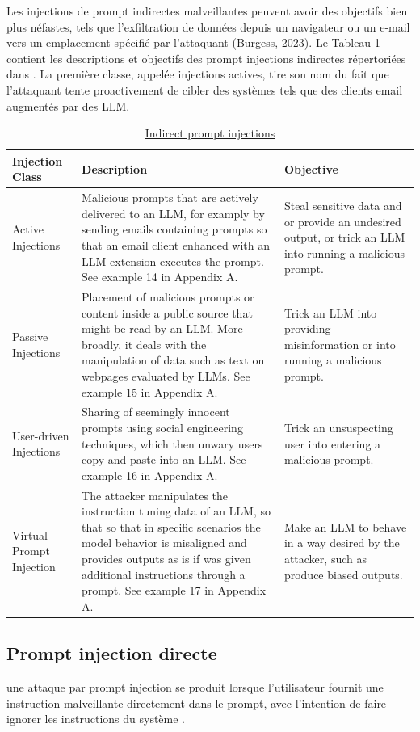 Les injections de prompt indirectes malveillantes peuvent avoir des objectifs bien plus néfastes, tels que l’exfiltration de données depuis un navigateur ou un e-mail vers un emplacement spécifié par l’attaquant (Burgess, 2023)\cite{burgess_security_nodate}. Le Tableau \ref{tab2} contient les descriptions et objectifs des prompt injections indirectes répertoriées dans \cite{rossi_early_2024}. La première classe, appelée injections actives, tire son nom du fait que l’attaquant tente proactivement de cibler des systèmes tels que des clients email augmentés par des LLM.
\begin{table}[h]
	\begin{tabular}{|l|p{6cm}|p{6cm}|}
		\hline
		\textbf{Injection Class} & \textbf{Description} & \textbf{Objective} \\
		\hline
		Active Injections & Malicious prompts that are actively delivered to an LLM, for examply by sending emails containing prompts so that an email client enhanced with an LLM extension executes the prompt. See example 14 in Appendix A. & Steal sensitive data and or provide an undesired output, or trick an LLM into running a malicious prompt. \\
		\hline
		Passive Injections  & Placement of malicious prompts or content inside a public source that might be read by an LLM. More broadly, it deals with the manipulation of data such as text on webpages evaluated by LLMs. See example 15 in Appendix A. & Trick an LLM into providing misinformation or into running a malicious prompt. \\
		\hline
		User-driven Injections & Sharing of seemingly innocent prompts using social engineering techniques, which then unwary users copy and paste into an LLM. See example 16 in Appendix A. & Trick an unsuspecting user into entering a malicious prompt. \\
		\hline
		Virtual Prompt Injection&The attacker manipulates the instruction tuning data of an LLM, so that so that in specific scenarios the model behavior is misaligned and provides outputs as is if was given additional instructions through a prompt. See example 17 in Appendix A. & Make an LLM to behave in a way desired by the attacker, such as produce biased outputs.\\
		\hline
	\end{tabular}
	\caption{\underline{Indirect prompt injections}}
	\label{tab2}
\end{table}	
\subsection{Prompt injection directe}
	une attaque par prompt injection se produit lorsque l’utilisateur fournit une instruction malveillante directement dans le prompt, avec l’intention de faire ignorer les instructions du système \cite{noauthor_securing_2023}.
	
